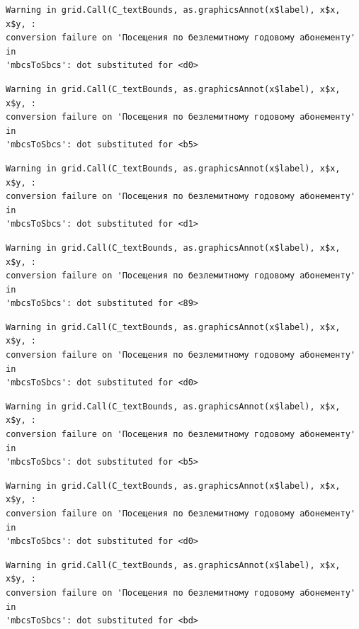 \documentclass[
  letterpaper,
  DIV=11,
  numbers=noendperiod]{scrartcl}
\begin{document}
\begin{verbatim}
Warning in grid.Call(C_textBounds, as.graphicsAnnot(x$label), x$x, x$y, :
conversion failure on 'Посещения по безлемитному годовому абонементу' in
'mbcsToSbcs': dot substituted for <d0>
\end{verbatim}

\begin{verbatim}
Warning in grid.Call(C_textBounds, as.graphicsAnnot(x$label), x$x, x$y, :
conversion failure on 'Посещения по безлемитному годовому абонементу' in
'mbcsToSbcs': dot substituted for <b5>
\end{verbatim}

\begin{verbatim}
Warning in grid.Call(C_textBounds, as.graphicsAnnot(x$label), x$x, x$y, :
conversion failure on 'Посещения по безлемитному годовому абонементу' in
'mbcsToSbcs': dot substituted for <d1>
\end{verbatim}

\begin{verbatim}
Warning in grid.Call(C_textBounds, as.graphicsAnnot(x$label), x$x, x$y, :
conversion failure on 'Посещения по безлемитному годовому абонементу' in
'mbcsToSbcs': dot substituted for <89>
\end{verbatim}

\begin{verbatim}
Warning in grid.Call(C_textBounds, as.graphicsAnnot(x$label), x$x, x$y, :
conversion failure on 'Посещения по безлемитному годовому абонементу' in
'mbcsToSbcs': dot substituted for <d0>
\end{verbatim}

\begin{verbatim}
Warning in grid.Call(C_textBounds, as.graphicsAnnot(x$label), x$x, x$y, :
conversion failure on 'Посещения по безлемитному годовому абонементу' in
'mbcsToSbcs': dot substituted for <b5>
\end{verbatim}

\begin{verbatim}
Warning in grid.Call(C_textBounds, as.graphicsAnnot(x$label), x$x, x$y, :
conversion failure on 'Посещения по безлемитному годовому абонементу' in
'mbcsToSbcs': dot substituted for <d0>
\end{verbatim}

\begin{verbatim}
Warning in grid.Call(C_textBounds, as.graphicsAnnot(x$label), x$x, x$y, :
conversion failure on 'Посещения по безлемитному годовому абонементу' in
'mbcsToSbcs': dot substituted for <bd>
\end{verbatim}
\end{document}
